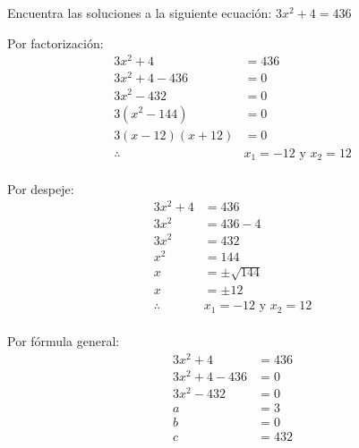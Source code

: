 Encuentra las soluciones a la siguiente ecuación:
$3x^2+4=436$

\begin{solutionbox}{13cm}
    \begin{multicols}{2}
        Por factorización:
        \begin{align*}
            3x^2+4            & =             436           \\
            3x^2+4-436        & =        0                  \\
            3x^2-432          & =          0                \\
            3(x^2-144)        & =        0                  \\
            3(x - 12)(x + 12) & =  0                        \\
            \therefore        & x_1 =-12 \text{ y } x_2 =12
        \end{align*}
        \\
        Por despeje:
        \begin{align*}
            3x^2+4     & = 436                       \\
            3x^2       & = 436-4                     \\
            3x^2       & = 432                       \\
            x^2        & = 144                       \\
            x          & = \pm\sqrt{144}             \\
            x          & = \pm 12                    \\
            \therefore & x_1 =-12 \text{ y } x_2 =12
        \end{align*}
        \\
        Por fórmula general:
        \begin{align*}
            3x^2+4     & =436                                                      \\
            3x^2+4-436 & = 0                                                       \\
            3x^2-432   & = 0                                                       \\
            a          & =3                                                        \\
            b          & =0                                                        \\
            c          & =432                                                      \\

\end{align*}
\end{multicols}
\end{solutionbox}
